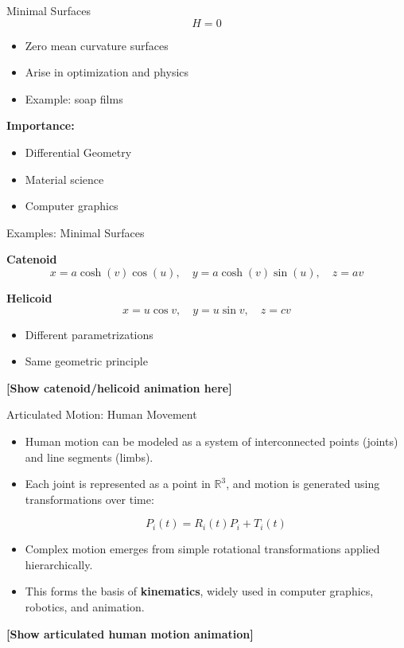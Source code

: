 \documentclass{beamer}
\begin{document}
\begin{frame}{Minimal Surfaces}
\[
H = 0
\]

\begin{itemize}
\item Zero mean curvature surfaces \cite{kobayashi}
\item Arise in optimization and physics
\item Example: soap films
\end{itemize}

\textbf{Importance:}
\begin{itemize}
\item Differential Geometry
\item Material science
\item Computer graphics
\end{itemize}
\end{frame}

\begin{frame}{Examples: Minimal Surfaces}

\textbf{Catenoid}
\[
x = a\cosh(v)\cos(u), \quad
y = a\cosh(v)\sin(u), \quad
z = av
\]

\textbf{Helicoid}
\[
x = u\cos v, \quad y = u\sin v, \quad z = cv
\]

\begin{itemize}
\item Different parametrizations
\item Same geometric principle \cite{kobayashi}
\end{itemize}

\vspace{0.3cm}
\textbf{[Show catenoid/helicoid animation here]}
\end{frame}

\begin{frame}{Articulated Motion: Human Movement}

\begin{itemize}
    \item Human motion can be modeled as a system of interconnected points (joints) and line segments (limbs).
    
    \item Each joint is represented as a point in $\mathbb{R}^3$, and motion is generated using transformations over time:
    
    \[
    P_i(t) = R_i(t) P_i + T_i(t)
    \]
    
    \item Complex motion emerges from simple rotational transformations applied hierarchically. \cite{friedberg}
    
    \item This forms the basis of \textbf{kinematics}, widely used in computer graphics, robotics, and animation.
\end{itemize}

\vspace{0.3cm}
\textbf{[Show articulated human motion animation]} \cite{numpy}
\end{frame}
\end{document}
